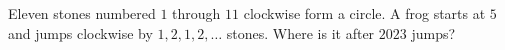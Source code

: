 Eleven stones numbered $1$ through $11$ clockwise form a circle. A frog starts at $5$ and jumps clockwise by $1,2,1,2,\ldots$ stones. Where is it after $2023$ jumps?
